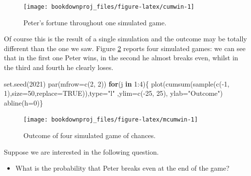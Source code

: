 \documentclass[
]{book}
\newenvironment{Shaded}{\begin{snugshade}}{\end{snugshade}}
\newcommand{\AttributeTok}[1]{\textcolor[rgb]{0.77,0.63,0.00}{#1}}
\newcommand{\ConstantTok}[1]{\textcolor[rgb]{0.00,0.00,0.00}{#1}}
\newcommand{\ControlFlowTok}[1]{\textcolor[rgb]{0.13,0.29,0.53}{\textbf{#1}}}
\newcommand{\DecValTok}[1]{\textcolor[rgb]{0.00,0.00,0.81}{#1}}
\newcommand{\FunctionTok}[1]{\textcolor[rgb]{0.00,0.00,0.00}{#1}}
\newcommand{\NormalTok}[1]{#1}
\newcommand{\SpecialCharTok}[1]{\textcolor[rgb]{0.00,0.00,0.00}{#1}}
\newcommand{\StringTok}[1]{\textcolor[rgb]{0.31,0.60,0.02}{#1}}
\providecommand{\tightlist}{%
  \setlength{\itemsep}{0pt}\setlength{\parskip}{0pt}}
\theoremstyle{definition}
\theoremstyle{definition}
\theoremstyle{definition}
\theoremstyle{definition}
\theoremstyle{remark}
\begin{document}
\begin{figure}

{\centering \texttt{[image: bookdownproj\_files/figure-latex/cumwin-1]} 

}

\caption{Peter's fortune throughout one simulated game.}\label{fig:cumwin}
\end{figure}

Of course this is the result of a single simulation and the outcome may be totally different than the one we saw. Figure \ref{fig:mcumwin} reports four simulated games: we can see that in the first one Peter wins, in the second he almost breaks even, whilst in the third and fourth he clearly loses.

\begin{Shaded}
\begin{Highlighting}[]
\FunctionTok{set.seed}\NormalTok{(}\DecValTok{2021}\NormalTok{)}
\FunctionTok{par}\NormalTok{(}\AttributeTok{mfrow=}\FunctionTok{c}\NormalTok{(}\DecValTok{2}\NormalTok{, }\DecValTok{2}\NormalTok{))}
\ControlFlowTok{for}\NormalTok{(j }\ControlFlowTok{in} \DecValTok{1}\SpecialCharTok{:}\DecValTok{4}\NormalTok{)\{}
  \FunctionTok{plot}\NormalTok{(}\FunctionTok{cumsum}\NormalTok{(}\FunctionTok{sample}\NormalTok{(}\FunctionTok{c}\NormalTok{(}\SpecialCharTok{{-}}\DecValTok{1}\NormalTok{, }\DecValTok{1}\NormalTok{),}\AttributeTok{size=}\DecValTok{50}\NormalTok{,}\AttributeTok{replace=}\ConstantTok{TRUE}\NormalTok{)),}\AttributeTok{type=}\StringTok{"l"}\NormalTok{ ,}\AttributeTok{ylim=}\FunctionTok{c}\NormalTok{(}\SpecialCharTok{{-}}\DecValTok{25}\NormalTok{, }\DecValTok{25}\NormalTok{), }\AttributeTok{ylab=}\StringTok{"Outcome"}\NormalTok{)}
  \FunctionTok{abline}\NormalTok{(}\AttributeTok{h=}\DecValTok{0}\NormalTok{)\}}
\end{Highlighting}
\end{Shaded}

\begin{figure}

{\centering \texttt{[image: bookdownproj\_files/figure-latex/mcumwin-1]} 

}

\caption{Outcome of four simulated game of chances.}\label{fig:mcumwin}
\end{figure}

Suppose we are interested in the following question.

\begin{itemize}
\tightlist
\item
  What is the probability that Peter breaks even at the end of the game?
\end{itemize}
\end{document}

